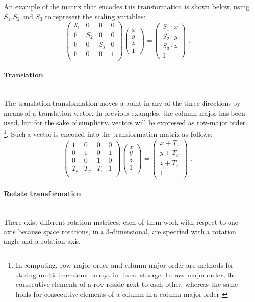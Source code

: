 \documentclass[12pt,a4paper]{extarticle}
\newcommand{\myparagraph}[1]{\paragraph{#1}\mbox{}\\}
\begin{document}
An example of the matrix that encodes this transformation is shown below, using $S_{1}$,$S_{2}$ and $S_{3}$ to represent the scaling variables:
\[
\begin{pmatrix}
S_{1} & 0 & 0 & 0\\
0 & S_{2} & 0 & 0\\
0 & 0 & S_{3} & 0\\
0 & 0 & 0 & 1\\
\end{pmatrix}
\begin{pmatrix}
x\\
y\\
z\\
1
\end{pmatrix}
=
\begin{pmatrix}
S_{1} \cdot x\\
S_{2} \cdot y\\
S_{3} \cdot z \\
1
\end{pmatrix}
\;.
\]
\myparagraph{Translation} The translation transformation moves a point in any of the three directions by means of a translation vector. In previous examples, the column-major has been used, but for the sake of simplicity, vectors will be expressed as row-major order. \footnote{In computing, row-major order and column-major order are methods for storing multidimensional arrays in linear storage. In row-major order, the consecutive elements of a row reside next to each other, whereas the same holds for consecutive elements of a column in a column-major order  \cite{wiki_row_major:1}}. 
Such a vector is encoded into the transformation matrix as follows:
\[
\begin{pmatrix}
1 & 0 & 0 & 0\\
0 & 1 & 0 & 1\\
0 & 0 & 1 & 0\\
T_{x} & T_{y} & T_{z} & 1\\
\end{pmatrix}
\begin{pmatrix}
x\\y\\z\\1\\
\end{pmatrix}
 = 
\begin{pmatrix}
x+T_{x}\\y+T_{y}\\z+T_{z}\\1\\
\end{pmatrix}
 \;.
\]
\myparagraph{Rotate transformation} There exist different rotation matrices, each of them work with respect to one axis because space rotations, in a 3-dimensional, are specified with a rotation angle and a rotation axis.
\end{document}
